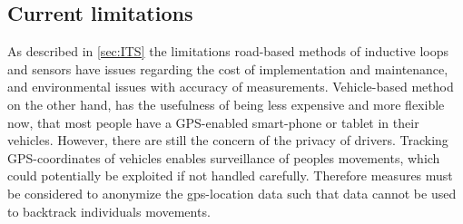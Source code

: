 \subsection{Current limitations}
As described in \ref{sec:ITS} the limitations road-based methods of inductive loops and sensors have issues regarding the cost of implementation and maintenance, and environmental issues with accuracy of measurements. Vehicle-based method on the other hand, has the usefulness of being less expensive and more flexible now, that most people have a GPS-enabled smart-phone or tablet in their vehicles. 
However, there are still the concern of the privacy of drivers. Tracking GPS-coordinates of vehicles enables surveillance of peoples movements, which could potentially be exploited if not handled carefully. Therefore measures must be considered to anonymize the gps-location data such that data cannot be used to backtrack individuals movements.
